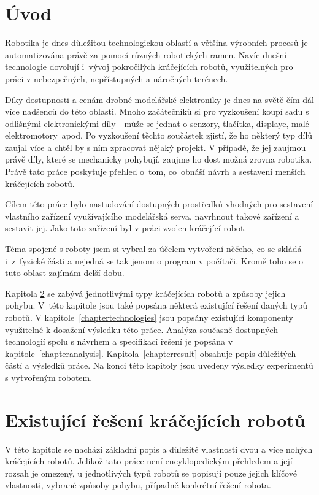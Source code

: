 \chapter{Úvod}

Robotika je dnes důležitou technologickou oblastí a většina výrobních procesů je automatizována právě za pomocí různých robotických ramen. Navíc dnešní technologie dovolují i~vývoj pokročilých kráčejících robotů, využitelných pro práci v nebezpečných, nepřístupných a náročných terénech.

Díky dostupnosti a cenám drobné modelářské elektroniky je dnes na světě čím dál více nadšenců do této oblasti. Mnoho začátečníků si pro vyzkoušení koupí sadu s odlišnými elektronickými díly - může se jednat o senzory, tlačítka, displaye, malé elektromotory~apod. Po vyzkoušení těchto součástek zjistí, že ho některý typ dílů zaujal více a chtěl by s ním zpracovat nějaký projekt. V případě, že jej zaujmou právě díly, které se mechanicky pohybují, zaujme ho dost možná zrovna robotika. Právě tato práce poskytuje přehled o~tom, co~obnáší návrh a sestavení menších kráčejících robotů.

Cílem této práce bylo nastudování dostupných prostředků vhodných pro sestavení vlastního zařízení využívajícího modelářská serva, navrhnout takové zařízení a sestavit jej. Jako toto zařízení byl v práci zvolen kráčející robot.

Téma spojené s roboty jsem si vybral za účelem vytvoření něčeho, co se skládá i~z~fyzické části a nejedná se tak jenom o program v počítači. Kromě toho se o tuto oblast zajímám delší dobu.

Kapitola \ref{chapterleggedRobots} se zabývá jednotlivými typy kráčejících robotů a způsoby jejich pohybu. V~této kapitole jsou také popsána některá existující řešení daných typů robotů. V kapitole~\ref{chaptertechnologies} jsou popsány existující komponenty využitelné k dosažení výsledku této práce. Analýza současně dostupných technologií spolu s návrhem a specifikací řešení je popsána v kapitole~\ref{chapteranalysis}. Kapitola~\ref{chapterresult} obsahuje popis důležitých částí a výsledků práce. Na konci této kapitoly jsou uvedeny výsledky experimentů s vytvořeným robotem.


\chapter{Existující řešení kráčejících robotů}
\label{chapterleggedRobots}
V této kapitole se nachází základní popis a důležité vlastnosti dvou a více nohých kráčejících robotů. Jelikož tato práce není encyklopedickým přehledem a její rozsah je omezený, u jednotlivých typů robotů se popisují pouze jejich klíčové vlastnosti, vybrané způsoby pohybu, případně konkrétní řešení robota.



